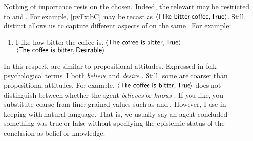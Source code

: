 \begin{note}
    \noindent%
    Nothing of importance rests on the  chosen.
    Indeed, the relevant  may be restricted to  and .
    For example, \ref{pvEx:bC} may be recast as \(\pv{\propI{I like bitter coffee}}{\valI{True}}\).
    Still, distinct  allows us to capture different aspects of on the same .
    For example:
    \begin{enumerate}[label=\arabic*., ref=(\arabic*),noitemsep, resume*=propValExC]
    \item I like how bitter the coffee is.%
      \hfill%
      \(\pv{\propI{The coffee is bitter}}{\valI{True}}\)\newline
      \hfill%
      \(\pv{\propI{The coffee is bitter}}{\valI{Desirable}}\)
    \end{enumerate}
    In this respect, \evalN{} are similar to propositional attitudes.
    Expressed in folk psychological terms, I both \emph{believe}  and \emph{desire} .
    Still, some  are coarser than propositional attitudes.
    For example, \(\pv{\propI{The coffee is bitter}}{\valI{True}}\) does not distinguish between whether the agent \emph{believes} or \emph{knows} .
    If you like, you substitute coarse  from finer grained values such as  and .
    However, I use  in keeping with natural language.
    That is, we usually say an agent concluded something was true or false without specifying the epistemic status of the conclusion as belief or knowledge.
  \end{note}

